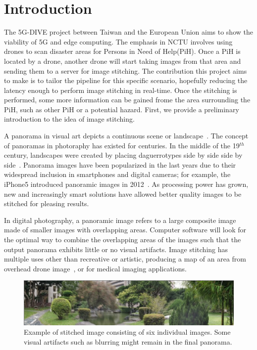 \documentclass[12pt, a4paper]{article}
\begin{document}
\section{Introduction}
\label{sec:Introduction}
The 5G-DIVE project between Taiwan and the European Union aims to show the viability of 
5G and edge computing. The emphasis in NCTU involves using drones to scan disaster areas
for Persons in Need of Help(PiH). Once a PiH is located by a drone, another drone will 
start taking images from that area and sending them to a server for image stitching. 
The contribution this project aims to make is to tailor the pipeline for this specific
scenario, hopefully reducing the latency enough to perform image stitching in real-time.
Once the stitching is performed, some more information can be gained frome the area 
surrounding the PiH,  such as other PiH or a potential hazard. First, we provide a
preliminary introduction to the idea of image stitching.

A panorama in visual art depicts a continuous scene or landscape~\cite{Panorama}. 
The concept of panoramas in photoraphy has existed for centuries. 
In the middle of the 19$^{th}$ century, landscapes were created by placing daguerrotypes side by side
side by side~\cite{OhioStitching}. Panorama images have been popularized in the last
years due to their widespread inclusion in smartphones and digital cameras; for example,
the iPhone5 introduced panoramic images in 2012~\cite{iPhoneStitch}. As processing
power has grown, new and increasingly smart solutions have allowed better quality
images to be stitched for pleasing results.

In digital photography, a panoramic image refers to a large composite image made of 
smaller images with overlapping areas. 
Computer software will look for the optimal way to combine the overlapping areas of the 
images such that the output panorama exhibits little or no visual artifacts. 
Image stitching has multiple uses other than recreative or artistic, producing
a map of an area from overhead drone image~\cite{OpenDroneMapTheMissingGuide}, or 
for medical imaging applications.


\begin{figure}[b]
		\label{fig:PanoExample}
		\centering
		\includegraphics[scale=0.4]{pano.png}
		\caption{Example of stitched image consisting of six individual images. Some visual 
		artifacts such as blurring might remain in the final panorama.}
\end{figure}
\end{document}
